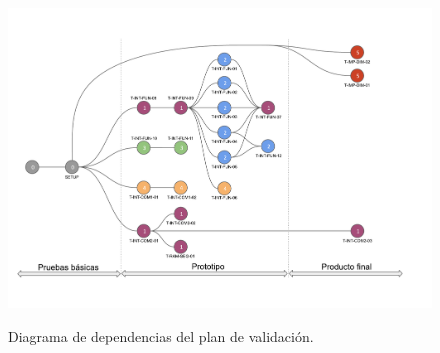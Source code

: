 \begin{figure}[H]
	\centering
	\includegraphics[width=0.9\linewidth,page=1]{ImagenesPlan de validacion/Diagrama de Dependencias de Validacion}
	\label{fig:diagrama_plan_validacion}
	\caption{Diagrama de dependencias del plan de validación.}
\end{figure}

%